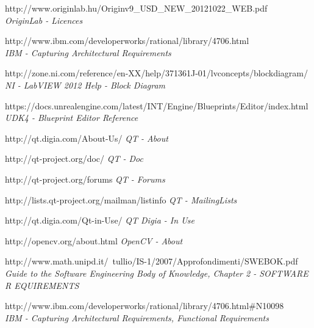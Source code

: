 \documentclass[a4paper,12pt,oneside]{report}
\begin{document}
\begin{thebibliography}{99}
		http://www.originlab.hu/Originv9\_USD\_NEW\_20121022\_WEB.pdf\\
        {\em OriginLab - Licences}
        
        http://www.ibm.com/developerworks/rational/library/4706.html\\
        {\em IBM - Capturing Architectural Requirements}  


		http://zone.ni.com/reference/en-XX/help/371361J-01/lvconcepts/blockdiagram/\\
        {\em NI - LabVIEW 2012 Help - Block Diagram}  

		https://docs.unrealengine.com/latest/INT/Engine/Blueprints/Editor/index.html\\
        {\em UDK4 - Blueprint Editor Reference}  


		http://qt.digia.com/About-Us/
        {\em QT - About } 
 
        http://qt-project.org/doc/
        {\em QT - Doc} 
         
        http://qt-project.org/forums
        {\em QT - Forums}        

          http://lists.qt-project.org/mailman/listinfo 
        {\em QT - MailingLists}        


        http://qt.digia.com/Qt-in-Use/
        {\em QT Digia - In Use}  
        
        
        http://opencv.org/about.html
        {\em OpenCV - About}  
        
        
        http://www.math.unipd.it/~tullio/IS-1/2007/Approfondimenti/SWEBOK.pdf\\
        {\em Guide to the Software Engineering Body of Knowledge, Chapter 2 - SOFTWARE R EQUIREMENTS}
        
        
		http://www.ibm.com/developerworks/rational/library/4706.html\#N10098 \\
        {\em IBM - Capturing Architectural Requirements, Functional Requirements }
        

        



\end{thebibliography}
\end{document}
